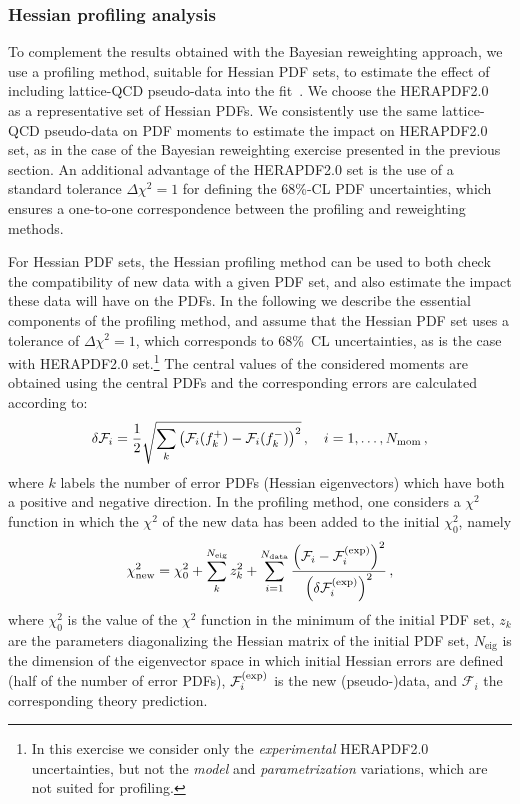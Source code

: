 \subsubsection{Hessian profiling analysis}
\label{sec:hessianprofiling}

To complement the results obtained
with the Bayesian reweighting approach,
we use a profiling method, suitable
for Hessian PDF sets, to estimate the effect of including
lattice-QCD pseudo-data into the fit~\cite{Paukkunen:2014zia,Camarda:2015zba}.
%
We
choose the HERAPDF2.0~\cite{Abramowicz:2015mha}
as a representative set of Hessian PDFs.
%
We consistently use the same lattice-QCD
pseudo-data on PDF moments to estimate the impact
on HERAPDF2.0 set, as in the case of the Bayesian reweighting
exercise presented in the previous section.
%
An additional advantage of the HERAPDF2.0 set is
the use
of a standard tolerance
$\Delta\chi^2=1$ for defining the 68\%-CL PDF
uncertainties, which ensures a
one-to-one correspondence between
the profiling and reweighting methods.

For Hessian PDF sets, the Hessian profiling method
can be used to both check the compatibility of new data with a given PDF set,
and also  estimate the impact these data will have on the PDFs. 
In the following we describe the essential components of the profiling method, 
and assume  that the  Hessian PDF set uses a tolerance of $\Delta\chi^2=1$, 
which corresponds to 68\%~CL uncertainties,
as is the case with HERAPDF2.0 set.\footnote{In this exercise
we consider only the {\it experimental} HERAPDF2.0
uncertainties, but not the {\it model} and {\it parametrization}
variations, which are not suited for profiling.}
%
The central values of the considered moments are obtained using the central PDFs and the corresponding
errors are calculated according to:
\begin{equation}
\delta\mathcal{F}_i = \frac{1}{2} \sqrt{\sum_{k}\left(\mathcal{F}_i(f_k^+)-\mathcal{F}_i(f_k^-)\right)^2}\, ,
\quad i=1,\ldots,N_{\rm mom} \, ,
\end{equation}
where $k$ labels the number of error PDFs (Hessian eigenvectors)
which have both a positive and negative direction.
%
In the profiling method, one considers a $\chi^2$ function in which the $\chi^2$ of the new
data has been added to the initial $\chi^2_0$, namely
\begin{equation}
\label{eq:newchi2}
\chi^2_{\text{new}} = \chi_0^2 + \sum_{k}^{N_{\text{eig}}} z_k^2
                    + \sum_{i=1}^{N_{\text{data}}}
                      \frac{\lp \mathcal{F}_i - \mathcal{F}_i^{\rm(exp)}\rp^2}
                           {\lp\delta\mathcal{F}_i^{\rm(exp)}\rp^2}\,,
\end{equation}
where $\chi^2_0$ is the value of the $\chi^2$ function in the minimum of the initial PDF set,
$z_k$ are the parameters diagonalizing the Hessian matrix of the initial PDF set,
$N_{\text{eig}}$ is the dimension of the eigenvector space in which initial Hessian errors are defined
(half of the number of error PDFs), $\mathcal{F}_i^{\rm(exp)}$ is the new
\hbox{(pseudo-)data},
and $\mathcal{F}_i$ the corresponding theory prediction.


